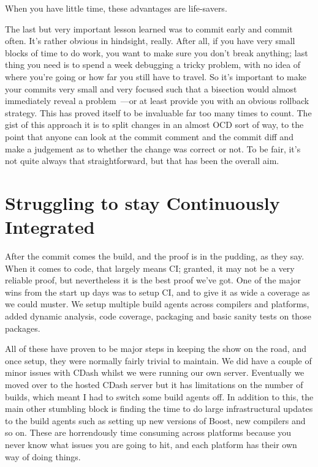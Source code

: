 \documentclass{book}
\begin{document}
When you have little time, these advantages are life-savers.

The last but very important lesson learned was to commit early and
commit often. It's rather obvious in hindsight, really. After all, if
you have very small blocks of time to do work, you want to make sure
you don't break anything; last thing you need is to spend a week
debugging a tricky problem, with no idea of where you're going or how
far you still have to travel. So it's important to make your commits
very small and very focused such that a bisection would almost
immediately reveal a problem~---or at least provide you with an obvious
rollback strategy. This has proved itself to be invaluable far too
many times to count. The gist of this approach it is to split changes
in an almost OCD sort of way, to the point that anyone can look at the
commit comment and the commit diff and make a judgement as to whether
the change was correct or not. To be fair, it's not quite always that
straightforward, but that has been the overall aim.

\section{Struggling to stay Continuously Integrated}

After the commit comes the build, and the proof is in the pudding, as
they say. When it comes to code, that largely means CI; granted, it
may not be a very reliable proof, but nevertheless it is the best
proof we've got. One of the major wins from the start up days was to
setup CI, and to give it as wide a coverage as we could muster. We
setup multiple build agents across compilers and platforms, added
dynamic analysis, code coverage, packaging and basic sanity tests on
those packages.

All of these have proven to be major steps in keeping the show on the
road, and once setup, they were normally fairly trivial to
maintain. We did have a couple of minor issues with CDash whilst we
were running our own server. Eventually we moved over to the hosted
CDash server but it has limitations on the number of builds, which
meant I had to switch some build agents off. In addition to this, the
main other stumbling block is finding the time to do large
infrastructural updates to the build agents such as setting up new
versions of Boost, new compilers and so on. These are horrendously
time consuming across platforms because you never know what issues you
are going to hit, and each platform has their own way of doing things.
\end{document}
